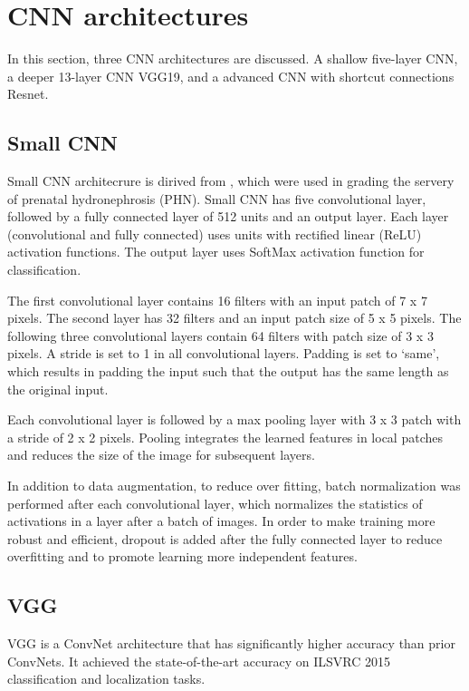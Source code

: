 \chapter{CNN architectures} 

In this section, three CNN architectures are discussed. A shallow five-layer CNN, a deeper 13-layer CNN VGG19, and a advanced CNN with shortcut connections Resnet.

\section{Small CNN}
Small CNN architecrure is dirived from \cite{Dhindsa2018}, which were used in grading the servery of prenatal hydronephrosis (PHN). Small CNN has five convolutional layer, followed by a fully connected layer of 512 units and an output layer. Each layer (convolutional and fully connected) uses units with rectified linear (ReLU) activation functions. The output layer uses SoftMax activation function for classification. 

The first convolutional layer contains 16 filters with an input patch of 7 x 7 pixels. The second layer has 32 filters and an input patch size of 5 x 5 pixels. The following three convolutional layers contain 64 filters with patch size of 3 x 3 pixels. A stride is set to 1 in all convolutional layers. Padding is set to ‘same’, which results in padding the input such that the output has the same length as the original input.

Each convolutional layer is followed by a max pooling layer with 3 x 3 patch with a stride of 2 x 2 pixels. Pooling integrates the learned features in local patches and reduces the size of the image for subsequent layers. 

In addition to data augmentation, to reduce over fitting, batch normalization was performed after each convolutional layer, which normalizes the statistics of activations in a layer after a batch of images. In order to make training more robust and efficient, dropout is added after the fully connected layer to reduce overfitting and to promote learning more independent features.

\section{VGG}
VGG \citep{vgg} is a ConvNet architecture that has significantly higher accuracy than prior ConvNets. It achieved the state-of-the-art accuracy on ILSVRC 2015 classification and localization tasks. 

